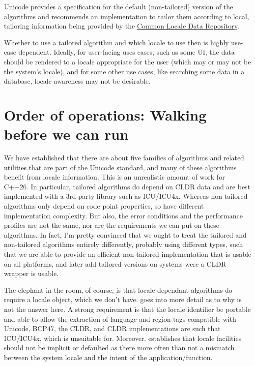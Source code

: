 \documentclass{wg21}
\begin{document}
Unicode provides a specification for the default (non-tailored) version of the algorithms and recommends an implementation to tailor them according to local, tailoring information being provided by the \href{https://cldr.Unicode.org/}{Common Locale Data Repository}.

Whether to use a tailored algorithm and which locale to use then is highly use-case dependent. Ideally, for user-facing uses cases, such as some UI,
the data should be rendered to a locale appropriate for the user (which may or may not be the system's locale), and for some other use cases, like searching some data in
a database, locale awareness may not be desirable.

\section{Order of operations: Walking before we can run}

We have established that there are about five families of algorithms and related utilities that are part of the Unicode standard, and many of these algorithms benefit from locale information. This is an unrealistic amount of work for C++26. In particular, tailored algorithms do depend on CLDR data and are best implemented with a 3rd party library
such as ICU/ICU4x.
Whereas non-tailored algorithms only depend on code point properties, so have different implementation complexity. But also, the error conditions and the performance profiles are not the same, nor are the requirements we can put on these algorithms.
In fact, I'm pretty convinced that we ought to treat the tailored and non-tailored algorithms entirely differently, probably using different types, such that we are able to provide an efficient non-tailored implementation that is usable on all platforms, and later add tailored versions on systems were a CLDR wrapper is usable.

The elephant in the room, of course, is that locale-dependant algorithms do require a locale object, which we don't have.
 goes into more detail as to why  is not the answer here.
A strong requirement is that the locale identifier be portable and able to allow the extraction of language and region tags compatible with Unicode, BCP47, the CLDR, and CLDR implementations are such that ICU/ICU4x, which  is unsuitable for.
Moreover,  establishes that locale facilities should not be implicit or defaulted as there more often than not a mismatch between the system locale and the intent of the application/function.
\end{document}
